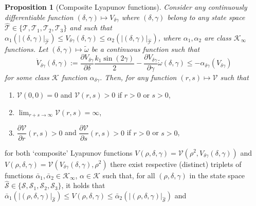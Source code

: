 \documentclass[journal,twoside,web]{ieeecolor}
\theoremstyle{definition}
\newtheorem{proposition}{Proposition}
\begin{document}
\begin{proposition}[{Composite Lyapunov functions}]\em 
\label{prop:composite_Lyap_function}
Consider 
any continuously differentiable function $(\delta,\gamma) \mapsto V_{\delta\gamma}$ where $(\delta,\gamma)$ belong to any state space $\hat{\mathcal{T}}\in\{\mathcal{T},\mathcal{T}_1,\mathcal{T}_2,\mathcal{T}_3\}$
and  such that 
$ \alpha_1(|(\delta, \gamma)|_{\hat{\mathcal{T}}}) \le V_{\delta\gamma}(\delta,\gamma) \le \alpha_2(|(\delta, \gamma)|_{\hat{\mathcal{T}}})$, where $\alpha_1, \alpha_2$ are class $\mathcal{K}_{\infty}$ functions. 
Let $(\delta,\gamma) \mapsto\tilde\omega$ be a continuous function such that 
\begin{equation*}
\dot V_{\delta\gamma}(\delta,\gamma) := \dfrac{\partial V_{\delta\gamma}}{\partial\delta}
\frac{k_1\sin(2\gamma)}{2}  -\dfrac{\partial V_{\delta\gamma}}{\partial\gamma}\tilde\omega(\delta,\gamma) \leq -\alpha_{\delta\gamma}(V_{\delta\gamma}) \label{eq:V_dot_delta_gamma}
\end{equation*}
for some class $\mathcal{K}$ function $\alpha_{\delta\gamma}$. 
Then, for {\em any} function $(r,s) \mapsto \mathcal{V}$ such that 
\begin{enumerate}
\item $\mathcal{V}(0,0)=0$ and $\mathcal{V}(r, s)>0$ if $r > 0 $ or $s > 0$, \label{it:pos_def_composite_Lyap_function} 
\item $\lim_{r+s\rightarrow\infty} \mathcal{V}(r,s) = \infty$, \label{it:the_other_condition}
\item $\dfrac{\partial \mathcal{V} }{\partial r }(r,s)>0$ and $\dfrac{\partial \mathcal{V} }{\partial s}(r,s)>0$ if $r>0$ or $s > 0$, \label{it:positive_partials}
\end{enumerate}
for both `composite' Lyapunov functions $V(\rho,\delta,\gamma) = \mathcal{V}\left(\rho^2,V_{\delta\gamma}(\delta,\gamma)\right)$ and $V(\rho,\delta,\gamma) = \mathcal{V}\left(V_{\delta\gamma}(\delta,\gamma), \rho^2 \right)$ there exist respective (distinct) 
triplets of functions $\bar\alpha_1,\bar\alpha_2\in\mathcal{K}_\infty$, $\alpha\in\mathcal{K}$
such that,  for all $(\rho,\delta,\gamma)$ in the state space $\hat{\mathcal{S}}\in\{\mathcal{S},\mathcal{S}_1,\mathcal{S}_2,\mathcal{S}_3\}$, it holds that  
$ \bar\alpha_1(|(\rho,\delta, \gamma)|_{\hat{\mathcal{S}}}) \le V(\rho,\delta,\gamma) \le \bar\alpha_2(|(\rho,\delta, \gamma)|_{\hat{\mathcal{S}}})$ and 

\end{proposition}
\end{document}
